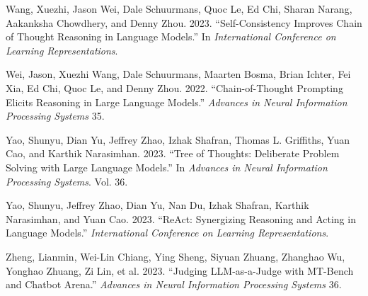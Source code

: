 \documentclass[11pt]{article}
\newlength{\cslhangindent}
\newenvironment{CSLReferences}[2] %
  {\setlength{\parindent}{0pt}%
   \setlength{\parskip}{#2\baselineskip}%
   \ifodd #1\relax
     \setlength{\leftskip}{\cslhangindent}%
     \setlength{\parindent}{-\cslhangindent}%
   \fi}
  {}
\begin{document}
\begin{CSLReferences}{1}{0}
\leavevmode{}%
Wang, Xuezhi, Jason Wei, Dale Schuurmans, Quoc Le, Ed Chi, Sharan
Narang, Aakanksha Chowdhery, and Denny Zhou. 2023. {``Self-Consistency
Improves Chain of Thought Reasoning in Language Models.''} In
\emph{International Conference on Learning Representations}.

\leavevmode{}%
Wei, Jason, Xuezhi Wang, Dale Schuurmans, Maarten Bosma, Brian Ichter,
Fei Xia, Ed Chi, Quoc Le, and Denny Zhou. 2022. {``Chain-of-Thought
Prompting Elicits Reasoning in Large Language Models.''} \emph{Advances
in Neural Information Processing Systems} 35.

\leavevmode{}%
Yao, Shunyu, Dian Yu, Jeffrey Zhao, Izhak Shafran, Thomas L. Griffiths,
Yuan Cao, and Karthik Narasimhan. 2023. {``Tree of Thoughts: Deliberate
Problem Solving with Large Language Models.''} In \emph{Advances in
Neural Information Processing Systems}. Vol. 36.

\leavevmode{}%
Yao, Shunyu, Jeffrey Zhao, Dian Yu, Nan Du, Izhak Shafran, Karthik
Narasimhan, and Yuan Cao. 2023. {``{ReAct}: Synergizing Reasoning and
Acting in Language Models.''} \emph{International Conference on Learning
Representations}.

\leavevmode{}%
Zheng, Lianmin, Wei-Lin Chiang, Ying Sheng, Siyuan Zhuang, Zhanghao Wu,
Yonghao Zhuang, Zi Lin, et al. 2023. {``Judging {LLM}-as-a-Judge with
{MT-Bench} and {Chatbot Arena}.''} \emph{Advances in Neural Information
Processing Systems} 36.

\end{CSLReferences}
\end{document}

